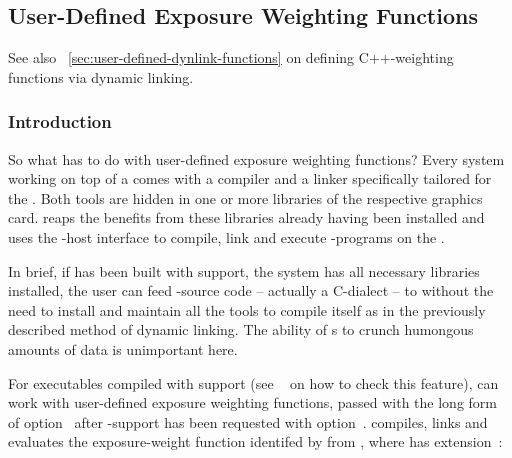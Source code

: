 

\subsection[User-Defined \acronym{OpenCL} Functions]{\label{sec:user-defined-opencl-functions}%
  User-Defined  Exposure Weighting Functions}

See also \sectionName~\ref{sec:user-defined-dynlink-functions} on defining C++-weighting
functions via dynamic linking.


\subsubsection[Introduction]{\label{sec:user-defined-opencl-functions-introduction}%
  Introduction}

%
%
So what has  to do with user-defined exposure weighting functions?  Every
 system working on top of a  comes with a compiler and a linker
specifically tailored for the .  Both tools are hidden in one or more libraries
of the respective graphics card.  \App{} reaps the benefits from these libraries already having
been installed and uses the -host interface to compile, link and execute
-programs on the .

In brief, if \appcmd{} has been built with  support, the system has all
necessary libraries installed, the user can feed -source code -- actually a
C-dialect -- to \App{} without the need to install and maintain all the tools to compile
\appcmd{} itself as in the previously described method of dynamic linking.  The ability of
s to crunch humongous amounts of data is unimportant here.

\smallskip

\noindent{}

%
%
For \App{} executables compiled with  support (see
\sectionName~ on how to check this feature), \App{} can work
with user-defined exposure weighting functions, passed with the long form of
option~ after -support has been requested with
option~.  \App{} compiles, links and evaluates the exposure-weight function
identifed by  from , where  has
extension~:

